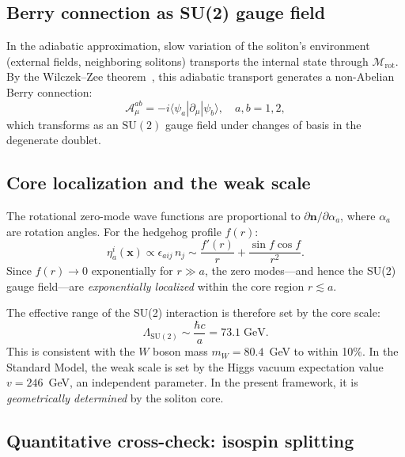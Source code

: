 \documentclass[a4paper,12pt]{article}
\begin{document}
\subsection{Berry connection as SU(2) gauge field}

In the adiabatic approximation, slow variation of the soliton's
environment (external fields, neighboring solitons) transports the
internal state through $\mathcal{M}_{\mathrm{rot}}$. By the
Wilczek--Zee theorem~\cite{WZ1984}, this adiabatic transport
generates a non-Abelian Berry connection:
\begin{equation}
 \mathcal{A}_\mu^{ab} = -i\langle \psi_a | \partial_\mu | \psi_b \rangle,
 \quad a,b = 1,2,
\end{equation}
which transforms as an $\mathrm{SU}(2)$ gauge field under changes of
basis in the degenerate doublet.

\subsection{Core localization and the weak scale}
\label{sec:su2scale}

The rotational zero-mode wave functions are proportional to
$\partial \mathbf{n}/\partial\alpha_a$, where $\alpha_a$ are
rotation angles. For the hedgehog profile $f(r)$:
\begin{equation}
 \eta_a^i(\mathbf{x}) \propto
 \epsilon_{aij}\,n_j \sim \frac{f'(r)}{r} + \frac{\sin f\cos f}{r^2}.
\end{equation}
Since $f(r) \to 0$ exponentially for $r \gg a$, the zero modes---and
hence the SU(2) gauge field---are \emph{exponentially localized}
within the core region $r \lesssim a$.

The effective range of the SU(2) interaction is therefore set by the
core scale:
\begin{equation}
 \Lambda_{\mathrm{SU(2)}} \sim \frac{\hbar c}{a}
 = 73.1\;\mathrm{GeV}.
\end{equation}
This is consistent with the $W$ boson mass $m_W = 80.4$~GeV to
within 10\%. In the Standard Model, the weak scale is set by the
Higgs vacuum expectation value $v = 246$~GeV, an independent
parameter. In the present framework, it is \emph{geometrically
determined} by the soliton core.

\subsection{Quantitative cross-check: isospin splitting}
\end{document}
